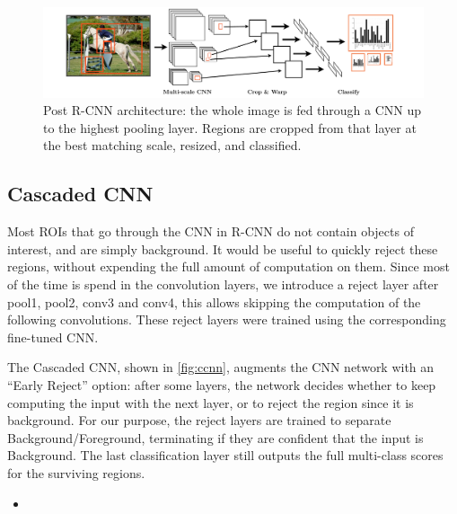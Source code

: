 \begin{figure}[h!]
\begin{center}
\includegraphics[width=0.98\columnwidth]{figures/dense_rcnn.pdf}
\caption{
Post R-CNN architecture: the whole image is fed through a CNN up to the highest pooling layer.
Regions are cropped from that layer at the best matching scale, resized, and classified.
}\label{fig:dense_rcnn}
\end{center}
\end{figure}

\subsection{Cascaded CNN}\label{sec:ccnn}

Most ROIs that go through the CNN in R-CNN do not contain objects of interest, and are simply background.
It would be useful to quickly reject these regions, without expending the full amount of computation on them. Since most of the time is spend in the convolution layers, we introduce a reject layer after pool1, pool2, conv3 and conv4, this allows skipping the computation of the following convolutions. These reject layers were trained using the corresponding fine-tuned CNN.

The Cascaded CNN, shown in \autoref{fig:ccnn}, augments the CNN network with an ``Early Reject'' option: after some layers, the network decides whether to keep computing the input with the next layer, or to reject the region since it is background.
For our purpose, the reject layers are trained to separate Background/Foreground, terminating if they are confident that the input is Background. The last classification layer still outputs the full multi-class scores for the surviving regions.

\begin{itemize}
\itemsep1pt\parskip0pt
\item
\end{itemize}


